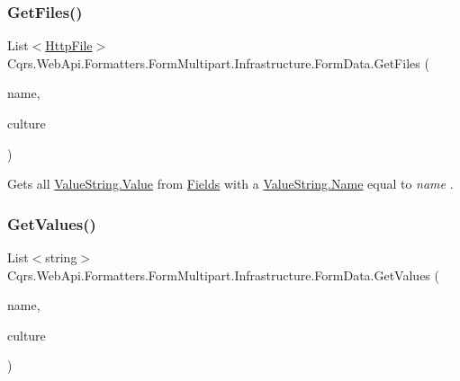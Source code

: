 \subsubsection{\texorpdfstring{Get\+Files()}{GetFiles()}}
{\footnotesize\ttfamily List$<$\hyperlink{classCqrs_1_1WebApi_1_1Formatters_1_1FormMultipart_1_1Infrastructure_1_1HttpFile}{Http\+File}$>$ Cqrs.\+Web\+Api.\+Formatters.\+Form\+Multipart.\+Infrastructure.\+Form\+Data.\+Get\+Files (\begin{DoxyParamCaption}\item[{string}]{name,  }\item[{Culture\+Info}]{culture }\end{DoxyParamCaption})}



Get\textquotesingle{}s all \hyperlink{classCqrs_1_1WebApi_1_1Formatters_1_1FormMultipart_1_1Infrastructure_1_1FormData_1_1ValueString_a2e4eb245c5d5148672d233903f2dfcd1_a2e4eb245c5d5148672d233903f2dfcd1}{Value\+String.\+Value} from \hyperlink{classCqrs_1_1WebApi_1_1Formatters_1_1FormMultipart_1_1Infrastructure_1_1FormData_a91cfdcbb3a074aadee7e7fc228c04a6a_a91cfdcbb3a074aadee7e7fc228c04a6a}{Fields} with a \hyperlink{classCqrs_1_1WebApi_1_1Formatters_1_1FormMultipart_1_1Infrastructure_1_1FormData_1_1ValueString_a75a080b90171a612155590a997076016_a75a080b90171a612155590a997076016}{Value\+String.\+Name} equal to {\itshape name} . 

\mbox{\label{classCqrs_1_1WebApi_1_1Formatters_1_1FormMultipart_1_1Infrastructure_1_1FormData_afee05e0f8f3d7752bd8feb168e68428b_afee05e0f8f3d7752bd8feb168e68428b}} 
\subsubsection{\texorpdfstring{Get\+Values()}{GetValues()}}
{\footnotesize\ttfamily List$<$string$>$ Cqrs.\+Web\+Api.\+Formatters.\+Form\+Multipart.\+Infrastructure.\+Form\+Data.\+Get\+Values (\begin{DoxyParamCaption}\item[{string}]{name,  }\item[{Culture\+Info}]{culture }\end{DoxyParamCaption})}



